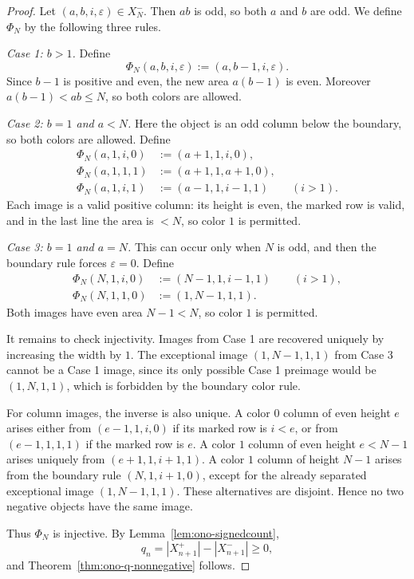 \documentclass[11pt,reqno]{amsart}
\theoremstyle{plain}
\theoremstyle{remark}
\theoremstyle{definition}
\numberwithin{equation}{section}
\newcommand{\coefauxprod}{q}
\begin{document}
\begin{proof}
Let $(a,b,i,\varepsilon)\in X_N^-$. Then $ab$ is odd, so both $a$ and $b$ are odd. We define $\Phi_N$ by the following three rules.

\emph{Case 1: $b>1$.} Define
\[
  \Phi_N(a,b,i,\varepsilon):=(a,b-1,i,\varepsilon).
\]
Since $b-1$ is positive and even, the new area $a(b-1)$ is even. Moreover $a(b-1)<ab\le N$, so both colors are allowed.

\emph{Case 2: $b=1$ and $a<N$.} Here the object is an odd column below the boundary, so both colors are allowed. Define
\[
\begin{aligned}
  \Phi_N(a,1,i,0)&:=(a+1,1,i,0),\\
  \Phi_N(a,1,1,1)&:=(a+1,1,a+1,0),\\
  \Phi_N(a,1,i,1)&:=(a-1,1,i-1,1) \qquad (i>1).
\end{aligned}
\]
Each image is a valid positive column: its height is even, the marked row is valid, and in the last line the area is $<N$, so color $1$ is permitted.

\emph{Case 3: $b=1$ and $a=N$.} This can occur only when $N$ is odd, and then the boundary rule forces $\varepsilon=0$. Define
\[
\begin{aligned}
  \Phi_N(N,1,i,0)&:=(N-1,1,i-1,1) \qquad (i>1),\\
  \Phi_N(N,1,1,0)&:=(1,N-1,1,1).
\end{aligned}
\]
Both images have even area $N-1<N$, so color $1$ is permitted.

It remains to check injectivity. Images from Case 1 are recovered uniquely by increasing the width by $1$. The exceptional image $(1,N-1,1,1)$ from Case 3 cannot be a Case 1 image, since its only possible Case 1 preimage would be $(1,N,1,1)$, which is forbidden by the boundary color rule.

For column images, the inverse is also unique. A color $0$ column of even height $e$ arises either from $(e-1,1,i,0)$ if its marked row is $i<e$, or from $(e-1,1,1,1)$ if the marked row is $e$. A color $1$ column of even height $e<N-1$ arises uniquely from $(e+1,1,i+1,1)$. A color $1$ column of height $N-1$ arises from the boundary rule $(N,1,i+1,0)$, except for the already separated exceptional image $(1,N-1,1,1)$. These alternatives are disjoint. Hence no two negative objects have the same image.

Thus $\Phi_N$ is injective. By Lemma~\ref{lem:ono-signedcount},
\[
  \coefauxprod _n=|X_{n+1}^+|-|X_{n+1}^-|\ge0,
\]
and Theorem~\ref{thm:ono-q-nonnegative} follows.
\end{proof}
\end{document}
